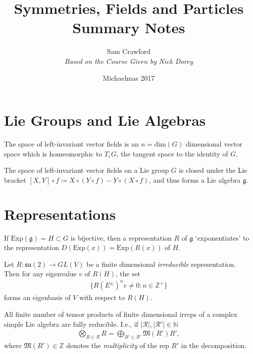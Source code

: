 \documentclass[11pt,final]{article}
\begin{document}
\title{Symmetries, Fields and Particles\\
\Large{Summary Notes} \\ \hrulefill}
\author{Sam Crawford\\
\large{\textsl{Based on the Course Given by Nick Dorey}}}
\date{Michaelmas 2017}

\maketitle

\section{Lie Groups and Lie Algebras}

\begin{prop}
The space of left-invariant vector fields is an $n=\text{dim}(G)$ dimensional vector space which is homeomorphic to $T_eG$, the tangent space to the identity of $G$.
\end{prop}

\begin{prop}
The space of left-invariant vector fields on a Lie group $G$ is closed under the Lie bracket $[X,Y]\circ f \coloneqq X\circ(Y\circ f) - Y \circ (X \circ f)$, and thus forms a Lie algebra $\mathfrak{g}$.
\end{prop}

\section{Representations}

\begin{prop}
If $\text{Exp}(\mathfrak{g}) = H \subset G$ is bijective, then a representation $R$ of $\mathfrak{g}$ `exponentiates' to the representation $D(\text{Exp}(x)) = \text{Exp}(R(x))$ of $H$.
\end{prop}

\begin{prop}
Let $R : \mathfrak{su}(2) \to GL(V)$ be a finite dimensional \textit{irreducible} representation. Then for any eigenvalue $v$ of $R(H)$, the set
\begin{align*}
\{ R(E^\pm)^nv \neq 0 : n \in \mathbb{Z}^+ \}
\end{align*}
forms an eigenbasis of $V$ with respect to $R(H)$.
\end{prop}

\begin{prop}
All finite number of tensor products of finite dimensional irreps of a complex simple Lie algebra are fully reducible. I.e., if $|\mathcal{R}|, |\mathcal{R}'| \in \mathbb{N}$
\begin{align}\label{RepDecompositions}
\bigotimes_{R \in \mathcal{R}} R = \bigoplus_{R' \in \mathcal{R}'} \mathfrak{M}(R') R',
\end{align}
where $\mathfrak{M}(R') \in \mathbb{Z}$ denotes the \textit{multiplicity} of the rep $R'$ in the decomposition.
\end{prop}
\end{document}
